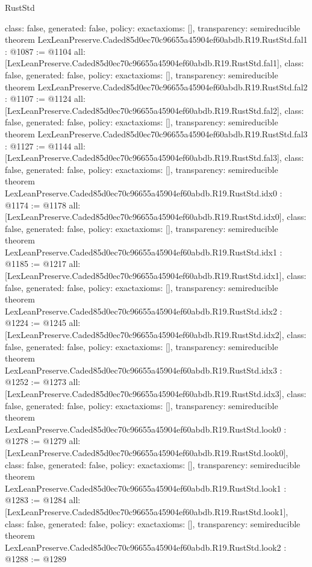\begin{lexlean}{RustStd}
\begin{coremodule}
{  class: false,
  generated: false,
  policy: exact{axioms: []},
  transparency: semireducible
}
theorem LexLeanPreserve.Caded85d0ec70c96655a45904ef60abdb.R19.RustStd.fal1 : @1087 := @1104 {
  all: [LexLeanPreserve.Caded85d0ec70c96655a45904ef60abdb.R19.RustStd.fal1],
  class: false,
  generated: false,
  policy: exact{axioms: []},
  transparency: semireducible
}
theorem LexLeanPreserve.Caded85d0ec70c96655a45904ef60abdb.R19.RustStd.fal2 : @1107 := @1124 {
  all: [LexLeanPreserve.Caded85d0ec70c96655a45904ef60abdb.R19.RustStd.fal2],
  class: false,
  generated: false,
  policy: exact{axioms: []},
  transparency: semireducible
}
theorem LexLeanPreserve.Caded85d0ec70c96655a45904ef60abdb.R19.RustStd.fal3 : @1127 := @1144 {
  all: [LexLeanPreserve.Caded85d0ec70c96655a45904ef60abdb.R19.RustStd.fal3],
  class: false,
  generated: false,
  policy: exact{axioms: []},
  transparency: semireducible
}
theorem LexLeanPreserve.Caded85d0ec70c96655a45904ef60abdb.R19.RustStd.idx0 : @1174 := @1178 {
  all: [LexLeanPreserve.Caded85d0ec70c96655a45904ef60abdb.R19.RustStd.idx0],
  class: false,
  generated: false,
  policy: exact{axioms: []},
  transparency: semireducible
}
theorem LexLeanPreserve.Caded85d0ec70c96655a45904ef60abdb.R19.RustStd.idx1 : @1185 := @1217 {
  all: [LexLeanPreserve.Caded85d0ec70c96655a45904ef60abdb.R19.RustStd.idx1],
  class: false,
  generated: false,
  policy: exact{axioms: []},
  transparency: semireducible
}
theorem LexLeanPreserve.Caded85d0ec70c96655a45904ef60abdb.R19.RustStd.idx2 : @1224 := @1245 {
  all: [LexLeanPreserve.Caded85d0ec70c96655a45904ef60abdb.R19.RustStd.idx2],
  class: false,
  generated: false,
  policy: exact{axioms: []},
  transparency: semireducible
}
theorem LexLeanPreserve.Caded85d0ec70c96655a45904ef60abdb.R19.RustStd.idx3 : @1252 := @1273 {
  all: [LexLeanPreserve.Caded85d0ec70c96655a45904ef60abdb.R19.RustStd.idx3],
  class: false,
  generated: false,
  policy: exact{axioms: []},
  transparency: semireducible
}
theorem LexLeanPreserve.Caded85d0ec70c96655a45904ef60abdb.R19.RustStd.look0 : @1278 := @1279 {
  all: [LexLeanPreserve.Caded85d0ec70c96655a45904ef60abdb.R19.RustStd.look0],
  class: false,
  generated: false,
  policy: exact{axioms: []},
  transparency: semireducible
}
theorem LexLeanPreserve.Caded85d0ec70c96655a45904ef60abdb.R19.RustStd.look1 : @1283 := @1284 {
  all: [LexLeanPreserve.Caded85d0ec70c96655a45904ef60abdb.R19.RustStd.look1],
  class: false,
  generated: false,
  policy: exact{axioms: []},
  transparency: semireducible
}
theorem LexLeanPreserve.Caded85d0ec70c96655a45904ef60abdb.R19.RustStd.look2 : @1288 := @1289 {
}
\end{coremodule}
\end{lexlean}
